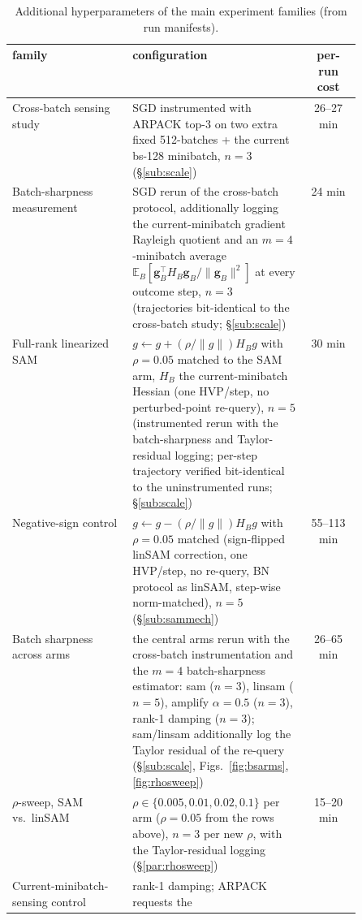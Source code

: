 \documentclass{article}
\theoremstyle{plain}
\theoremstyle{definition}
\theoremstyle{remark}
\newcommand{\RTableTopGap}{%
  \setlength{\abovetopsep}{2pt}%
}
\begin{document}
\begin{table}[!ht]
\centering\footnotesize
\setlength{\tabcolsep}{4pt}
\caption{Additional hyperparameters of the main experiment families
(from run manifests).}
\label{tab:hyperB}
{\renewcommand{\arraystretch}{1.05}\RTableTopGap
\begin{tabular}{lp{0.50\linewidth}c}
\toprule
family & configuration & per-run cost \\
\midrule
Cross-batch sensing study & SGD instrumented with ARPACK top-3 on two extra
fixed 512-batches + the current bs-128 minibatch, $n{=}3$
(\S\ref{sub:scale}) & 26--27 min \\
\addlinespace[1.5pt]
Batch-sharpness measurement & SGD rerun of the cross-batch protocol,
additionally logging the current-minibatch gradient Rayleigh quotient and
an $m{=}4$-minibatch average $\mathbb{E}_{B}[
\mathbf{g}_{B}^{\!\top}H_{B}\mathbf{g}_{B}/\|\mathbf{g}_{B}\|^{2}]$ at
every outcome step, $n{=}3$ (trajectories bit-identical to the cross-batch
study; \S\ref{sub:scale}) & 24 min \\
\addlinespace[1.5pt]
Full-rank linearized SAM & $g\leftarrow g+(\rho/\|g\|)H_{B}g$ with
$\rho{=}0.05$ matched to the SAM arm, $H_{B}$ the current-minibatch
Hessian (one HVP/step, no perturbed-point re-query), $n{=}5$
(instrumented rerun with the batch-sharpness and Taylor-residual logging;
per-step trajectory verified bit-identical
to the uninstrumented runs; \S\ref{sub:scale}) & 30 min \\
\addlinespace[1.5pt]
Negative-sign control & $g\leftarrow g-(\rho/\|g\|)H_{B}g$
with $\rho{=}0.05$ matched (sign-flipped linSAM correction, one
HVP/step, no re-query, BN protocol as linSAM, step-wise
norm-matched), $n{=}5$ (\S\ref{sub:sammech}) & 55--113 min \\
\addlinespace[1.5pt]
Batch sharpness across arms & the central arms rerun with the
cross-batch instrumentation and the $m{=}4$ batch-sharpness estimator:
sam ($n{=}3$), linsam ($n{=}5$), amplify $\alpha{=}0.5$ ($n{=}3$), rank-1
damping ($n{=}3$); sam/linsam additionally log the Taylor residual of the
re-query (\S\ref{sub:scale}, Figs.~\ref{fig:bsarms}, \ref{fig:rhosweep})
& 26--65 min \\
\addlinespace[1.5pt]
$\rho$-sweep, SAM vs.\ linSAM & $\rho\in\{0.005,0.01,0.02,0.1\}$ per arm
($\rho{=}0.05$ from the rows above), $n{=}3$ per new $\rho$, with the
Taylor-residual logging (\S\ref{par:rhosweep}) & 15--20 min \\
\addlinespace[1.5pt]
Current-minibatch-sensing control & rank-1 damping; ARPACK requests the

\end{tabular}}
\end{table}
\end{document}
